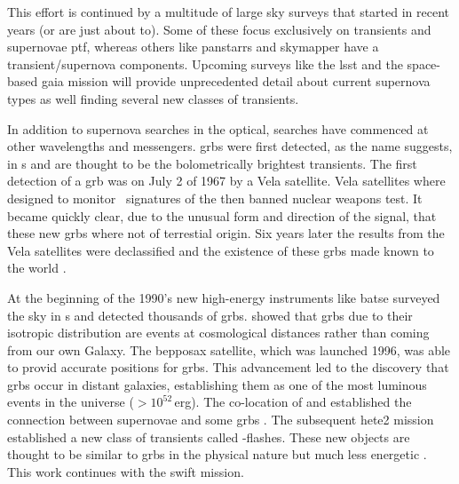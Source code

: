 This effort is continued by a multitude of large sky surveys that started in recent years (or are just about to). Some of these focus exclusively on transients and supernovae \gls{ptf}, whereas others like \gls{panstarrs} and \gls{skymapper} have a transient/supernova components. Upcoming surveys like the \gls{lsst} and the space-based \gls{gaia} mission will provide unprecedented detail about current supernova types as well finding several new classes of transients.

In addition to supernova searches in the optical, searches have commenced at other wavelengths and messengers. \glspl{grb} were first detected, as the name suggests, in \gammaray s and are thought to be the bolometrically brightest  transients. The first detection of a \gls{grb} was on July 2 of 1967 by a Vela satellite. Vela satellites where designed to monitor \gammaray\ signatures of the then banned nuclear weapons test. It became quickly clear, due to the unusual form and direction of the signal, that these new \glspl{grb} where not of terrestial origin. Six years later the results from the Vela satellites were declassified and the existence of these \glspl{grb} made known to the world \citep{1973ApJ...182L..85K}. 


At the beginning of the 1990's new high-energy instruments like \gls{batse} surveyed the sky in \gammaray s and detected thousands of \glspl{grb}. \citet{1992Natur.355..143M} showed that \glspl{grb} due to their isotropic distribution are events at cosmological distances rather than coming from our own Galaxy. The \gls{bepposax} satellite, which was launched 1996, was able to provid accurate positions for \glspl{grb}. This advancement led to the discovery that \glspl{grb} occur in distant galaxies, establishing them as one of the most luminous events in the universe ($>10^{52}$\,erg). The co-location of  and  established the connection between supernovae and some \glspl{grb} \citep{1998Natur.395..670G}. The subsequent \gls{hete2} mission established a new class of transients called \xray-flashes. These new objects are thought to be similar to  \glspl{grb} in the physical nature but much less energetic \citep{2004ApJ...601L.119Z}. This work continues with the \gls{swift} mission. 

